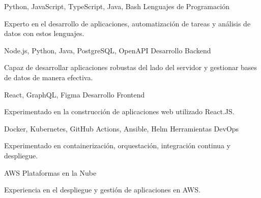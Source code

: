 \begin{cventries}
  \cventry
  {Python, JavaScript, TypeScript, Java, Bash}
  {Lenguajes de Programación}
  {}
  {}
  {
    \begin{cvitems}
      \item {Experto en el desarrollo de aplicaciones, automatización de tareas y análisis de datos con estos lenguajes.}
    \end{cvitems}
  }

  \cventry
  {Node.js, Python, Java, PostgreSQL, OpenAPI}
  {Desarrollo Backend}
  {}
  {}
  {
    \begin{cvitems}
      \item{Capaz de desarrollar aplicaciones robustas del lado del servidor y gestionar bases de datos de manera efectiva.}
    \end{cvitems}
  }

  \cventry
  {React, GraphQL, Figma}
  {Desarrollo Frontend}
  {}
  {}
  {
    \begin{cvitems}
      \item {Experimentado en la construcción de aplicaciones web utilizado React.JS.}
    \end{cvitems}
  }

  \vspace{1.0mm}
  \cventry
  {Docker, Kubernetes, GitHub Actions, Ansible, Helm}
  {Herramientas DevOps}
  {}
  {}
  {
    \begin{cvitems}
      \item {Experimentado en containerización, orquestación, integración continua y despliegue.}
    \end{cvitems}
  }

  \vspace{1.0mm}
  \cventry
  {AWS}
  {Plataformas en la Nube}
  {}
  {}
  {
    \begin{cvitems}
      \item {Experiencia en el despliegue y gestión de aplicaciones en AWS.}
    \end{cvitems}
  }
\end{cventries}
